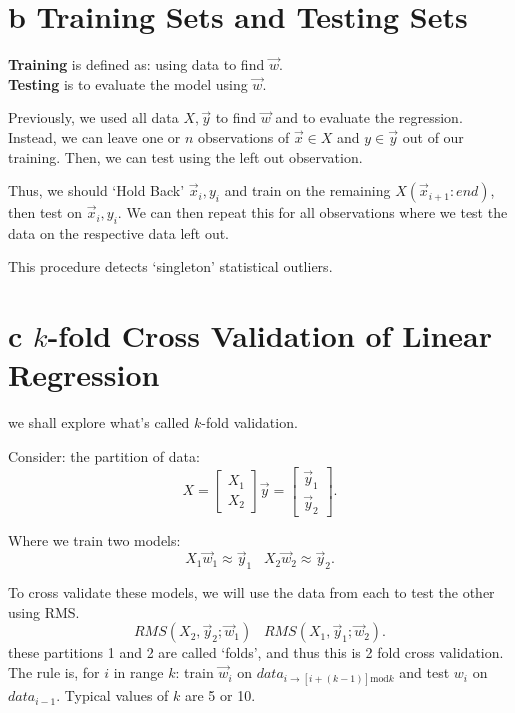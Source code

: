 \documentclass[12pt]{book}
\begin{document}
\section*{b Training Sets and Testing Sets}
\textbf{Training} is defined as: using data to find $\vec w$.\\
\textbf{Testing} is to evaluate the model using  $\vec w$.

Previously, we used all data  $X,\vec y$ to find  $\vec w$ and to evaluate the regression.
Instead, we can leave one or $n$ observations of  $\vec x \in X$ and  $y\in\vec y$ out of our 
        training. Then, we can test using the left out observation.

Thus, we should `Hold Back' $\vec x_i, y_i$ and train on the remaining  $X\left( \vec x_{i+1}:end\right)$, then 
        test on $\vec x_i, y_i$. 
We can then repeat this for all observations where we test the data on the respective data left out.

This procedure detects `singleton' statistical outliers.

\section*{c $k$-fold Cross Validation of Linear Regression}
we shall explore what's called $k$-fold validation.

Consider: the partition of data:
\[
X = \begin{bmatrix} X_1\\X_2 \end{bmatrix} \vec y = \begin{bmatrix} \vec y_1\\ \vec y_2 \end{bmatrix}  
.\] 

Where we train two models:
\[
X_1\vec w_1\approx \vec y_1\;\;\;X_2\vec w_2 \approx \vec y_2
.\] 

To cross validate these models, we will use the data from each to test the other using RMS.
\[
RMS(X_2,\vec y_2;\vec w_1)\;\;\;RMS(X_1,\vec y_1;\vec w_2)
.\] 
these partitions 1 and 2 are called `folds', and thus this is 2 fold cross validation.
The rule is, for $i$ in range  $k$: train  $\vec w_i$ on  $data_{i\to [i+(k-1)]\text{mod} k}$ and test $w_i$ on  $data_{i-1}$.
Typical values of $k$ are 5 or 10. 
\pagebreak
\end{document}
